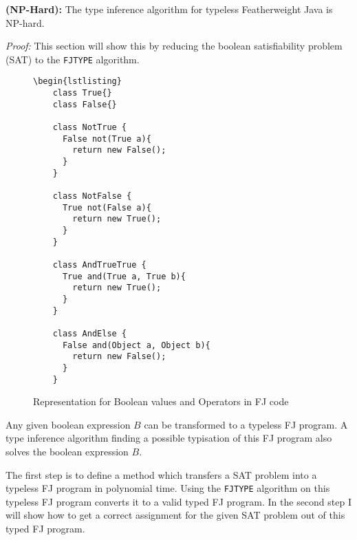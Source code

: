 
\begin{theoremAndi}
  \label{theo:np-hardness}
  \textbf{(NP-Hard):}
  The type inference algorithm for typeless Featherweight Java is NP-hard.
\end{theoremAndi}

\textit{Proof:} This section will show this by reducing the boolean satisfiability problem (SAT) to the \texttt{FJTYPE} algorithm.

\begin{figure}
\begin{lstlisting}
\begin{lstlisting}
    class True{}
    class False{}
    
    class NotTrue {
      False not(True a){
        return new False();
      }
    }
    
    class NotFalse {
      True not(False a){
        return new True();
      }
    }
    
    class AndTrueTrue {
      True and(True a, True b){
        return new True();
      }
    }
    
    class AndElse {
      False and(Object a, Object b){
        return new False();
      }
    }

\end{lstlisting}

\caption{Representation for Boolean values and Operators in FJ code}
\label{fig:fjSATcode}
\end{figure}

Any given boolean expression $B$ can be transformed to a typeless FJ program.
A type inference algorithm finding a possible typisation of this FJ program also solves the boolean expression $B$.

The first step is to define a method which transfers a SAT problem into
a typeless FJ program in polynomial time.
Using the \texttt{FJTYPE} algorithm on this typeless FJ program converts it to a valid typed FJ program.
In the second step I will show how to get a correct assignment for the given SAT problem 
out of this typed FJ program.


